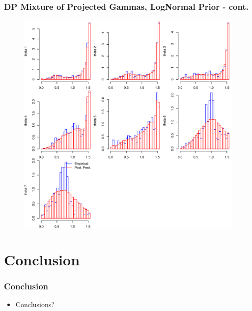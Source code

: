 \documentclass[aspectratio=169]{beamer}
\begin{document}
\begin{frame}
  \frametitle{DP Mixture of Projected Gammas, LogNormal Prior - cont.}
  \begin{figure}
    \centering
    \includegraphics[scale = 0.43]{./images/dppgln_emp_v_pred_2_1e1}
  \end{figure}
\end{frame}

\section{Conclusion}

\begin{frame}
  \frametitle{Conclusion}
  \begin{itemize}
    \item Conclusions?
  \end{itemize}
\end{frame}
\end{document}
